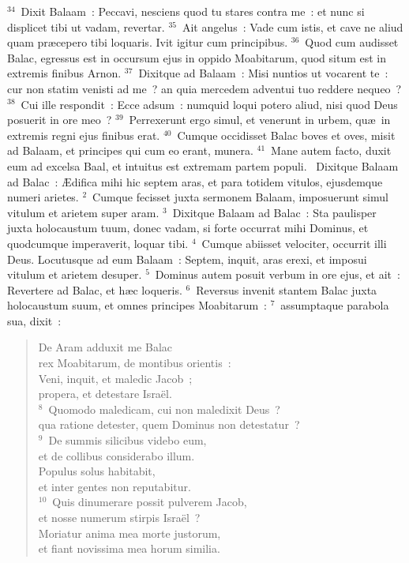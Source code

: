 ${}^{34}$~Dixit Balaam~: Peccavi, nesciens quod tu stares contra me~: et nunc si displicet tibi ut vadam, revertar.
${}^{35}$~Ait angelus~: Vade cum istis, et cave ne aliud quam pr\ae cepero tibi loquaris. Ivit igitur cum principibus.
${}^{36}$~Quod cum audisset Balac, egressus est in occursum ejus in oppido Moabitarum, quod situm est in extremis finibus Arnon.
${}^{37}$~Dixitque ad Balaam~: Misi nuntios ut vocarent te~: cur non statim venisti ad me~? an quia mercedem adventui tuo reddere nequeo~?
${}^{38}$~Cui ille respondit~: Ecce adsum~: numquid loqui potero aliud, nisi quod Deus posuerit in ore meo~?
${}^{39}$~Perrexerunt ergo simul, et venerunt in urbem, qu\ae\ in extremis regni ejus finibus erat.
${}^{40}$~Cumque occidisset Balac boves et oves, misit ad Balaam, et principes qui cum eo erant, munera.
${}^{41}$~Mane autem facto, duxit eum ad excelsa Baal, et intuitus est extremam partem populi.
~\lettrine[lines=10,image=true,loversize=0.05,lraise=-0.03]{D}{}ixitque Balaam ad Balac~: \AE difica mihi hic septem aras, et para totidem vitulos, ejusdemque numeri arietes.
${}^{2}$~Cumque fecisset juxta sermonem Balaam, imposuerunt simul vitulum et arietem super aram.
${}^{3}$~Dixitque Balaam ad Balac~: Sta paulisper juxta holocaustum tuum, donec vadam, si forte occurrat mihi Dominus, et quodcumque imperaverit, loquar tibi.
${}^{4}$~Cumque abiisset velociter, occurrit illi Deus. Locutusque ad eum Balaam~: Septem, inquit, aras erexi, et imposui vitulum et arietem desuper.
${}^{5}$~Dominus autem posuit verbum in ore ejus, et ait~: Revertere ad Balac, et h\ae c loqueris.
${}^{6}$~Reversus invenit stantem Balac juxta holocaustum suum, et omnes principes Moabitarum~:
${}^{7}$~assumptaque parabola sua, dixit~: \begin{flushleft}\begin{verse}De Aram adduxit me Balac\\ rex Moabitarum, de montibus orientis~:\\ Veni, inquit, et maledic Jacob~;\\ propera, et detestare Isra\"el.\\
${}^{8}$~Quomodo maledicam, cui non maledixit Deus~?\\ qua ratione detester, quem Dominus non detestatur~?\\
${}^{9}$~De summis silicibus videbo eum,\\ et de collibus considerabo illum.\\ Populus solus habitabit,\\ et inter gentes non reputabitur.\\
${}^{10}$~Quis dinumerare possit pulverem Jacob,\\ et nosse numerum stirpis Isra\"el~?\\ Moriatur anima mea morte justorum,\\ et fiant novissima mea horum similia.\end{verse}\end{flushleft}



